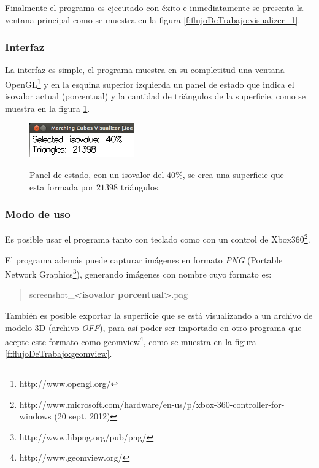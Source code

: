 Finalmente el programa es ejecutado con éxito e inmediatamente se presenta la ventana principal como se muestra en la figura \ref{f:flujoDeTrabajo:visualizer_1}.

\subsubsection{Interfaz}
\label{ch:propuesta:sec:extraccionDeLaSuperficie:subsec:interfaz}

La interfaz es simple, el programa muestra en su completitud una ventana OpenGL\footnote{http://www.opengl.org/} y en la esquina superior izquierda un panel de estado que indica el isovalor actual (porcentual) y la cantidad de triángulos de la superficie, como se muestra en la figura \ref{f:flujoDeTrabajo:interface}.

\begin{figure}[h]
\centering
	\fbox
	{
		\includegraphics[width=0.4\textwidth]{images/visualizer/interface.png}
	}
\caption[Panel de estado, con un isovalor del 40\%.]{Panel de estado, con un isovalor del 40\%, se crea una superficie que esta formada por $21398$ triángulos.}
\label{f:flujoDeTrabajo:interface}
\end{figure}

\subsubsection{Modo de uso}
\label{ch:propuesta:sec:extraccionDeLaSuperficie:subsec:modoDeUso}

Es posible usar el programa tanto con teclado como con un control de Xbox360\textsuperscript{\textregistered}\footnote{http://www.microsoft.com/hardware/en-us/p/xbox-360-controller-for-windows (20 sept. 2012)}.

El programa además puede capturar imágenes en formato \emph{PNG} (Portable Network \mbox{Graphics}\footnote{http://www.libpng.org/pub/png/}), generando imágenes con nombre cuyo formato es:

\begin{quote}
	screenshot\_\textbf{\textless isovalor porcentual\textgreater}.png
\end{quote}

También es posible exportar la superficie que se está visualizando a un archivo de modelo 3D (archivo \emph{OFF}), para así poder ser importado en otro programa que acepte este formato como geomview\footnote{http://www.geomview.org/}, como se muestra en la figura \ref{f:flujoDeTrabajo:geomview}.

